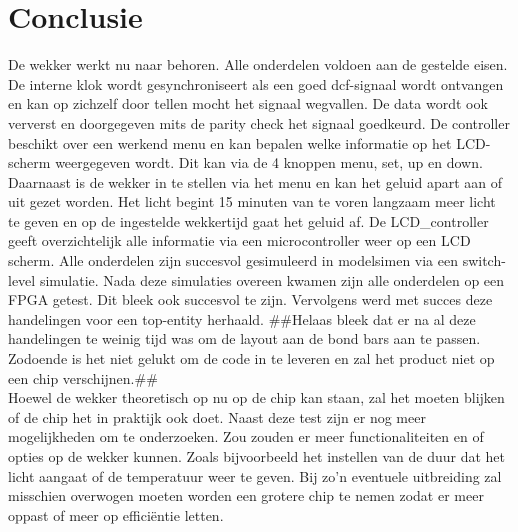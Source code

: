\chapter{Conclusie}

De wekker werkt nu naar behoren. Alle onderdelen voldoen aan de gestelde eisen. De interne klok wordt gesynchroniseert als een goed dcf-signaal wordt ontvangen en kan op zichzelf door tellen mocht het signaal wegvallen. De data wordt ook ververst en doorgegeven mits de parity check het signaal goedkeurd. De controller beschikt over een werkend menu en kan bepalen welke informatie op het LCD-scherm weergegeven wordt. Dit kan via de 4 knoppen menu, set, up en down. Daarnaast is de wekker in te stellen via het menu en kan het geluid apart aan of uit gezet worden. Het licht begint 15 minuten van te voren langzaam meer licht te geven en op de ingestelde wekkertijd gaat het geluid af.  De LCD\_controller geeft overzichtelijk alle informatie via een microcontroller weer op een LCD scherm.
Alle onderdelen zijn succesvol gesimuleerd in modelsim\textregistered en via een switch-level simulatie. Nada deze simulaties overeen kwamen zijn alle onderdelen op een FPGA getest. Dit bleek ook succesvol te zijn. Vervolgens werd met succes deze handelingen voor een top-entity herhaald.
\#\#Helaas bleek dat er na al deze handelingen te weinig tijd was om de layout aan de bond bars aan te passen. Zodoende is het niet gelukt om de code in te leveren en zal het product niet op een chip verschijnen.\#\#
\\
Hoewel de wekker theoretisch op nu op de chip kan staan, zal het moeten blijken of de chip het in praktijk ook doet. Naast deze test zijn er nog meer mogelijkheden om te onderzoeken. Zou zouden er meer functionaliteiten en of opties op de wekker kunnen. Zoals bijvoorbeeld het instellen van de duur dat het licht aangaat of de temperatuur weer te geven. Bij zo'n eventuele uitbreiding zal misschien overwogen moeten worden een grotere chip te nemen zodat er meer oppast of meer op effici\"entie letten.